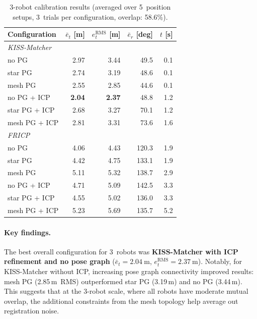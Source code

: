 \begin{table}[htbp]
    \centering
    \caption{3-robot calibration results (averaged over 5~position
             setups, 3~trials per configuration, overlap: 58.6\%).}
    \label{tab:results_3r}
    \small
    \begin{tabular}{l r r r r}
        \toprule
        \textbf{Configuration}
            & $\bar{e}_t$ [m]
            & $e_t^\mathrm{RMS}$ [m]
            & $\bar{e}_r$ [deg]
            & $t$ [s] \\
        \midrule
        \multicolumn{5}{l}{\textit{KISS-Matcher}} \\
        \quad no PG             & 2.97  & 3.44  & 49.5  & 0.1 \\
        \quad star PG           & 2.74  & 3.19  & 48.6  & 0.1 \\
        \quad mesh PG           & 2.55  & 2.85  & 44.6  & 0.1 \\
        \quad no PG + ICP       & \textbf{2.04}  & \textbf{2.37}  & 48.8  & 1.2 \\
        \quad star PG + ICP     & 2.68  & 3.27  & 70.1  & 1.2 \\
        \quad mesh PG + ICP     & 2.81  & 3.31  & 73.6  & 1.6 \\
        \midrule
        \multicolumn{5}{l}{\textit{FRICP}} \\
        \quad no PG             & 4.06  & 4.43  & 120.3 & 1.9 \\
        \quad star PG           & 4.42  & 4.75  & 133.1 & 1.9 \\
        \quad mesh PG           & 5.11  & 5.32  & 138.7 & 2.9 \\
        \quad no PG + ICP       & 4.71  & 5.09  & 142.5 & 3.3 \\
        \quad star PG + ICP     & 4.55  & 5.02  & 136.0 & 3.3 \\
        \quad mesh PG + ICP     & 5.23  & 5.69  & 135.7 & 5.2 \\
        \bottomrule
    \end{tabular}
\end{table}

\paragraph{Key findings.}
The best overall configuration for 3~robots was
\textbf{KISS-Matcher with ICP refinement and no pose graph}
($\bar{e}_t = \SI{2.04}{\metre}$, $e_t^\mathrm{RMS} =
\SI{2.37}{\metre}$).
Notably, for KISS-Matcher without ICP, increasing pose graph
connectivity improved results: mesh PG (2.85\,m~RMS) outperformed
star PG (3.19\,m) and no PG (3.44\,m).
This suggests that at the 3-robot scale, where all robots have
moderate mutual overlap, the additional constraints from the mesh
topology help average out registration noise.

